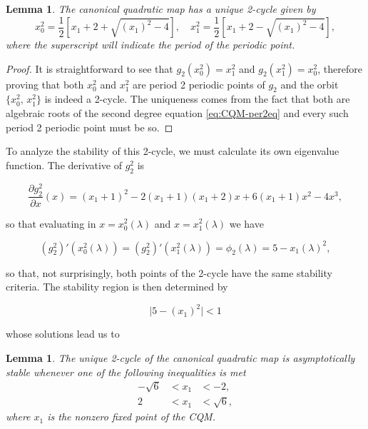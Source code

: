 \documentclass[10pt,twoside,titlepage]{book}
\numberwithin{equation}{chapter}
\numberwithin{figure}{chapter}
\numberwithin{table}{chapter}
\theoremstyle{plain}%
\newtheorem{lem}[thm]{Lemma}
\theoremstyle{definition}
\theoremstyle{remark}
\begin{document}
\begin{lem}
	The canonical quadratic map has a unique 2-cycle given by
	\begin{equation*}
		\label{eq:per2-CQM}
		x_0^2=\frac{1}{2}\left[x_1+2+\sqrt{(x_1)^2-4}\right], \quad x_1^2=\frac{1}{2}\left[x_1+2-\sqrt{(x_1)^2-4}\right],
	\end{equation*}
	where the superscript will indicate the period of the periodic point.
\end{lem}
\begin{proof}
	It is straightforward to see that $g_2(x_0^2)=x_1^2$ and $g_2(x_1^2)=x_0^2$, therefore proving that both $x_0^2$ and $x_1^2$ are period 2 periodic points of $g_2$ and the orbit $\{x_0^2,\,x_1^2\}$ is indeed a 2-cycle. The uniqueness comes from the fact that both are algebraic roots of the second degree equation \eqref{eq:CQM-per2eq} and every such period 2 periodic point must be so.
\end{proof}

To analyze the stability of this 2-cycle, we must calculate its own eigenvalue function. The derivative of $g_2^2$ is

\begin{equation*}
	\frac{\partial g_2^2}{\partial x}(x)=(x_1+1)^2-2(x_1+1)(x_1+2)x+6(x_1+1)x^2-4x^3,
\end{equation*}

so that evaluating in $x=x_0^2(\lambda)$ and $x=x_1^2(\lambda)$ we have

\begin{equation}
	\label{eq:eigfun-x02-CQM}
	\left(g^2_2\right)'(x_0^2(\lambda))=\left(g^2_2\right)'(x_1^2(\lambda))=\phi_2(\lambda)=5-x_1(\lambda)^2,
\end{equation}

so that, not surprisingly, both points of the 2-cycle have the same stability criteria. The stability region is then determined by

\[\vert 5-(x_1)^2\vert<1\]

whose solutions lead us to

\begin{lem}
	\label{lem:CQM-stb-2cycle}
	The unique 2-cycle of the canonical quadratic map is asymptotically stable whenever one of the following inequalities is met
	\begin{equation*}
		\begin{aligned}
			-\sqrt{6}	&< x_1 &< -2,\\
			2 &< x_1 &< \sqrt{6},
		\end{aligned}
	\end{equation*}
	where $x_1$ is the nonzero fixed point of the CQM.
\end{lem}
\end{document}
